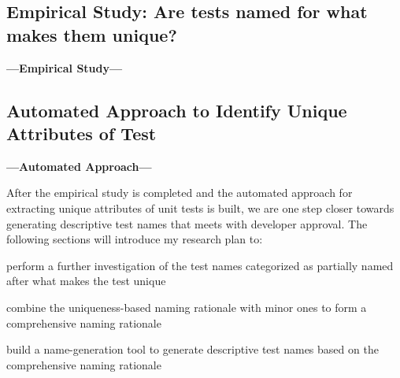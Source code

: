 \subsection{Empirical Study: Are tests named for what makes them unique?}
\label{sec:empStudy}

\textbf{---Empirical Study---}


\subsection{Automated Approach to Identify Unique Attributes of Test}
\label{sec:auto-approach}

\textbf{---Automated Approach---}


After the empirical study is completed and the automated approach for extracting unique attributes of unit tests is built, we are one step closer towards generating descriptive test names that meets with developer approval.
%
The following sections will introduce my research plan to:
\begin{enumerate*}
    \item perform a further investigation of the test names categorized as partially named after what makes the test unique
    \item combine the uniqueness-based naming rationale with minor ones to form a comprehensive naming rationale
    \item build a name-generation tool to generate descriptive test names based on the comprehensive naming rationale 
\end{enumerate*}

